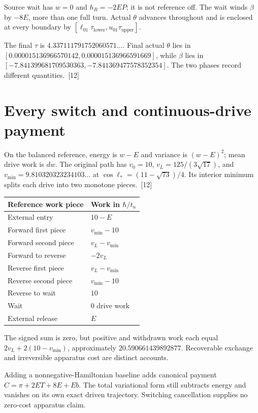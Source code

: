 \documentclass[10pt,twocolumn,letterpaper]{article}
\begin{document}
Source wait has $w=0$ and $h_R=-2EP$; it is not reference off. The wait winds $\beta$ by $-8E$, more than one full turn. Actual $\theta$ advances throughout and is enclosed at every boundary by $[\ell_{01}\tau_{\mathrm{lower}},u_{01}\tau_{\mathrm{upper}}]$.

The final $\tau$ is $4.337111791752060571\ldots$. Final actual $\theta$ lies in $[0.000015136966570142,\allowbreak 0.000015136966591669]$, while $\beta$ lies in $[-7.841399681709530363,\allowbreak -7.841369477578352354]$. The two phases record different quantities.~[12]

\section{Every switch and continuous-drive payment}
On the balanced reference, energy is $w-E$ and variance is $(w-E)^2$; mean drive work is $dw$. The original path has $v_0=10$, $v_L=125/(3\sqrt{17})$, and $v_{\min}=9.810320323234103\ldots$ at $\cos\ell_*=(11-\sqrt{73})/4$. Its interior minimum splits each drive into two monotone pieces.~[12]

\begin{center}
\small
\setlength{\tabcolsep}{4pt}
\begin{tabular}{@{}ll@{}}
\toprule
Reference work piece & Work in $\hbar/t_u$\\
\midrule
External entry & $10-E$\\
Forward first piece & $v_{\min}-10$\\
Forward second piece & $v_L-v_{\min}$\\
Forward to reverse & $-2v_L$\\
Reverse first piece & $v_L-v_{\min}$\\
Reverse second piece & $v_{\min}-10$\\
Reverse to wait & $10$\\
Wait & $0$ drive work\\
External release & $E$\\
\bottomrule
\end{tabular}
\end{center}

The signed sum is zero, but positive and withdrawn work each equal $2v_L+2(10-v_{\min})$, approximately $20.590661439892877$. Recoverable exchange and irreversible apparatus cost are distinct accounts.

Adding a nonnegative-Hamiltonian baseline adds canonical payment $C=\pi+2ET+8E+Eb$. The total variational form still subtracts energy and vanishes on its own exact driven trajectory. Switching cancellation supplies no zero-cost apparatus claim.
\end{document}
